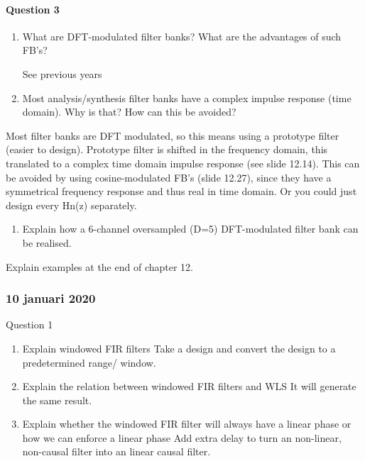 \documentclass[
  a4paper,
  ,captions=tableheading
]{scrartcl}
\providecommand{\tightlist}{%
  \setlength{\itemsep}{0pt}\setlength{\parskip}{0pt}}
\begin{document}
\paragraph{Question 3}\label{question-3-3}

\begin{enumerate}
\def\labelenumi{\arabic{enumi}.}
\item
  What are DFT-modulated filter banks? What are the advantages of such
  FB's?

  See previous years
\item
  Most analysis/synthesis filter banks have a complex impulse response
  (time domain). Why is that? How can this be avoided?
\end{enumerate}

Most filter banks are DFT modulated, so this means using a prototype
filter (easier to design). Prototype filter is shifted in the frequency
domain, this translated to a complex time domain impulse response (see
slide 12.14). This can be avoided by using cosine-modulated FB's (slide
12.27), since they have a symmetrical frequency response and thus real
in time domain. Or you could just design every Hn(z) separately.

\begin{enumerate}
\def\labelenumi{\arabic{enumi}.}
\setcounter{enumi}{2}
\tightlist
\item
  Explain how a 6-channel oversampled (D=5) DFT-modulated filter bank
  can be realised.
\end{enumerate}

Explain examples at the end of chapter 12.

\subsubsection{\texorpdfstring{\textbf{10 januari
2020}}{10 januari 2020}}\label{januari-2020-2}

Question 1

\begin{enumerate}
\def\labelenumi{\arabic{enumi}.}
\tightlist
\item
  Explain windowed FIR filters Take a design and convert the design to a
  predetermined range/ window.\\
\item
  Explain the relation between windowed FIR filters and WLS It will
  generate the same result.\\
\item
  Explain whether the windowed FIR filter will always have a linear
  phase or how we can enforce a linear phase Add extra delay to turn an
  non-linear, non-causal filter into an linear causal filter.
\end{enumerate}
\end{document}

